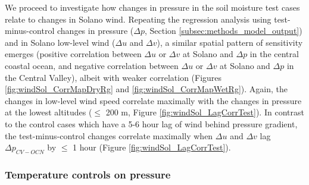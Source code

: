 We proceed to investigate how changes in pressure in the soil moisture test cases relate to changes in Solano wind.  Repeating the regression analysis using test-minus-control changes in pressure ($\Delta p$, Section \ref{subsec:methods_model_output}) and in Solano low-level wind ($\Delta u$ and $\Delta v$), a similar spatial pattern of sensitivity emerges (positive correlation between $\Delta u$ or $\Delta v$ at Solano and $\Delta p$ in the central coastal ocean, and negative correlation between $\Delta u$ or $\Delta v$ at Solano and $\Delta p$ in the Central Valley), albeit with weaker correlation (Figures \ref{fig:windSol_CorrMapDryRg} and \ref{fig:windSol_CorrMapWetRg}).  Again, the changes in low-level wind speed correlate maximally with the changes in pressure at the lowest altitudes ($\le$ 200 m, Figure \ref{fig:windSol_LagCorrTest}).  In contrast to the control cases which have a 5-6 hour lag of wind behind pressure gradient, the test-minus-control changes correlate maximally when $\Delta u$ and $\Delta v$ lag $\Delta p_{CV-OCN}$ by $\le$ 1 hour (Figure \ref{fig:windSol_LagCorrTest}).

\subsubsection{Temperature controls on pressure}

